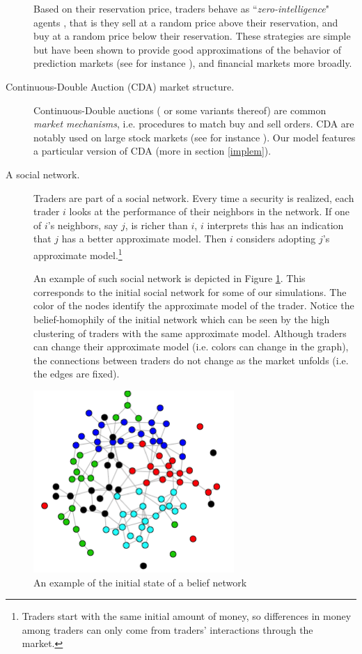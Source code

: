 \documentclass{sig-alternate}
\begin{document}
\begin{description}
		  Based on their reservation price, traders behave as ``\emph{zero-intelligence}" agents \citep{Gode1993}, that is they sell at a random price above their reservation, and buy at a random price below their reservation. These strategies are simple but have been shown to provide good approximations of the behavior of prediction markets (see for instance \cite{Klingert2012c}), and financial markets more broadly. 
		  
		\item[Continuous-Double Auction (CDA) market structure.] Continuous-Double auctions ( or some variants thereof) are common \emph{market mechanisms}, i.e. procedures to match buy and sell orders. CDA are notably used on large stock markets (see for instance \cite{Tseng2010a}). Our model features a particular version of CDA (more in section \ref{implem}). 
		
		\item[A social network.] Traders are part of a social network. Every time a security is realized, each trader $i$ looks at the performance of their neighbors in the network. If one of $i$'s neighbors, say $j$, is richer than $i$, $i$ interprets this has an indication that $j$ has a better approximate model. Then $i$ considers adopting $j$'s approximate model.\footnote{Traders start with the same initial amount of money, so differences in money among traders can only come from  traders' interactions through the market.} 
		
		An example of such social network is depicted in Figure \ref{socnet}. This corresponds to the initial social network for some of our simulations. The color of the nodes identify the approximate model of the trader. Notice the belief-homophily of the initial network which can be seen by the high clustering of traders with the same approximate model. Although traders can change their approximate model (i.e. colors can change in the graph), the connections between traders do not change as the market unfolds (i.e. the edges are fixed).
	\end{description}
	
	\begin{figure}
		\begin{center}
		\includegraphics[scale = 0.5]{network.png}
		\end{center}
		\caption{An example of the initial state of a belief network \label{socnet}}
	\end{figure}
	
\end{document}
